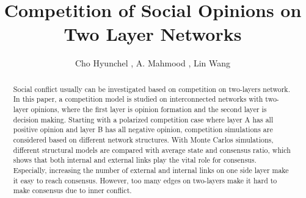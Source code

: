 \documentclass[english]{cccconf}
\begin{document}
\title{Competition of Social Opinions on Two Layer Networks}


\author{Cho Hyunchel ,
        A. Mahmood ,
        Lin Wang }

\maketitle

\begin{abstract}
Social conflict usually can be investigated based on competition on two-layers network. In this paper, a competition model is studied on interconnected networks with two-layer opinions, where the first layer is opinion formation and the second layer is decision making. Starting with a polarized competition case where layer A has all positive opinion and layer B has all negative opinion, competition simulations are considered based on different network structures. With Monte Carlos simulations, different structural models are compared with average state and consensus ratio, which shows that both internal and external links play the vital role for consensus. Especially, increasing the number of external and internal links on one side layer make it easy to reach consensus. However, too many edges on two-layers make it hard to make consensus due to inner conflict.
\end{abstract}


\end{document}
